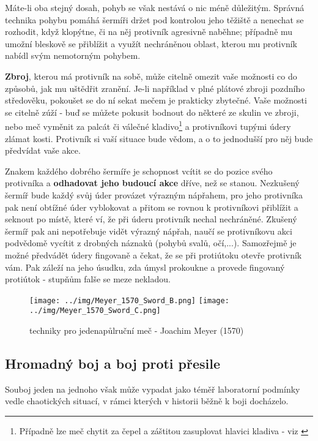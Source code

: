Máte-li oba stejný dosah, pohyb se však nestává o nic méně důležitým. Správná technika pohybu pomáhá šermíři držet pod kontrolou jeho těžiště a nenechat se rozhodit, když klopýtne, či na něj protivník agresivně naběhne; případně mu umožní bleskově se přiblížit a využít nechráněnou oblast, kterou mu protivník nabídl svým nemotorným pohybem. 

\textbf{Zbroj}, kterou má protivník na sobě, může citelně omezit vaše možnosti co do způsobů, jak mu uštědřit zranění. Je-li například v plné plátové zbroji pozdního středověku, pokoušet se do ní sekat mečem je prakticky zbytečné. Vaše možnosti se citelně zúží - buď se můžete pokusit bodnout do některé ze skulin ve zbroji, nebo meč vyměnit za palcát či válečné kladivo\footnote{Případně lze meč chytit za čepel a záštitou zasuplovat hlavici kladiva - viz \cite{FightingWithTheGermanLongsword}} a protivníkovi tupými údery zlámat kosti. Protivník si vaší situace bude vědom, a o to jednodušší pro něj bude předvídat vaše akce.

Znakem každého dobrého šermíře je schopnost vcítit se do pozice svého protivníka a \textbf{odhadovat jeho budoucí akce} dříve, než se stanou. Nezkušený šermíř bude každý svůj úder provázet výrazným nápřahem, pro jeho protivníka pak není obtížné úder vyblokovat a přitom se rovnou k protivníkovi přiblížit a seknout po místě, které ví, že při úderu protivník nechal nechráněné. Zkušený šermíř pak ani nepotřebuje vidět výrazný nápřah, naučí se protivníkovu akci podvědomě vycítit z drobných náznaků (pohybů svalů, očí,...). Samozřejmě je možné předvádět údery fingovaně a čekat, že se při protiútoku otevře protivník vám. Pak záleží na jeho úsudku, zda úmysl prokoukne a provede fingovaný protiútok - stupňům falše se meze nekladou. 


\begin{figure}[h]\centering
    \center
    \texttt{[image: ../img/Meyer\_1570\_Sword\_B.png]}
    \texttt{[image: ../img/Meyer\_1570\_Sword\_C.png]}
    \caption{techniky pro jedenapůlruční meč - Joachim Meyer (1570) \cite{KunstDesFechtens}}
    \label{obr01:KunstDesFechtens}
    
\end{figure}

\subsection{Hromadný boj a boj proti přesile} \label{organizedFightingIrlSubsection}
Souboj jeden na jednoho však může vypadat jako téměř laboratorní podmínky vedle chaotických situací, v rámci kterých v historii běžně k boji docházelo.   

